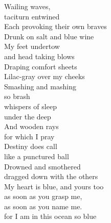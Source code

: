Wailing waves,\\
taciturn entwined\\
Each provoking their own braves\\
Drunk on salt and blue wine\\
My feet undertow\\
and head taking blows\\
Draping comfort sheets\\
Lilac-gray over my cheeks\\
Smashing and mashing\\
so brash\\
whispers of sleep\\
under the deep\\
And wooden rays\\
for which I pray\\
Destiny does call\\
like a punctured ball\\
Drowned and smothered\\
dragged down with the others\\

My heart is blue, and yours too\\
as soon as you grasp me,\\
as soon as you name me.\\
for I am in this ocean so blue\\


